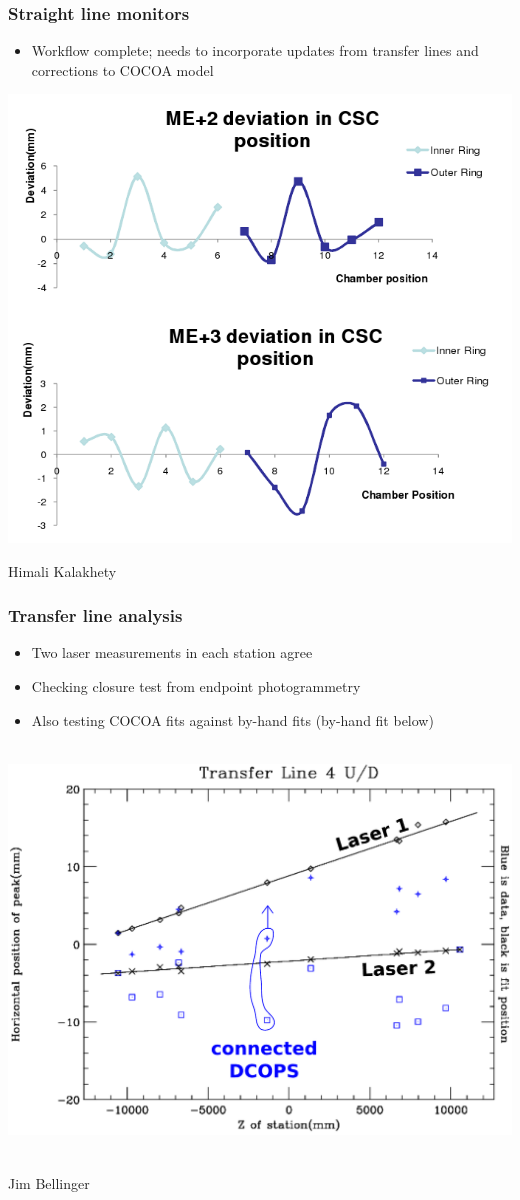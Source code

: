 \documentclass[compress]{beamer}
\begin{document}
\begin{frame}
\frametitle{Straight line monitors}

\begin{itemize}
\item Workflow complete; needs to incorporate updates from transfer lines and corrections to COCOA model
\end{itemize}

\begin{center}
\includegraphics[width=0.7\linewidth]{himali_plot.png}
\end{center}

\vspace{-0.75 cm}
\hfill Himali Kalakhety
\end{frame}

\begin{frame}
\frametitle{Transfer line analysis}

\begin{itemize}
\item Two laser measurements in each station agree
\item Checking closure test from endpoint photogrammetry
\item Also testing COCOA fits against by-hand fits (by-hand fit below)
\end{itemize}

\mbox{ } \hfill \includegraphics[width=0.7\linewidth]{HZ_Hand_Line4.pdf} \hfill \hfill \hfill \mbox{ }

\vspace{-0.75 cm}
\hfill Jim Bellinger
\end{frame}
\end{document}
